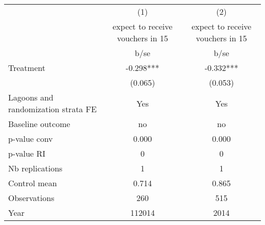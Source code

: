 \begin{tabular}{lcc}\hline
                    &         (1)   &         (2)   \\
                    &expect to receive vouchers in 15   &expect to receive vouchers in 15   \\
                    &        b/se   &        b/se   \\
\hline
Treatment           &      -0.298***&      -0.332***\\
                    &     (0.065)   &     (0.053)   \\
Lagoons and randomization strata FE&         Yes   &         Yes   \\
Baseline outcome    &          no   &          no   \\
p-value conv        &       0.000   &       0.000   \\
p-value RI          &           0   &           0   \\
Nb replications     &           1   &           1   \\
Control mean        &       0.714   &       0.865   \\
Observations        &         260   &         515   \\
Year                &      112014   &        2014   \\
\hline\end{tabular}
